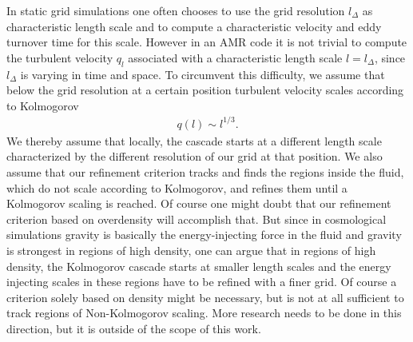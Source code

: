 In static grid simulations one often chooses to use the grid resolution
$l_{\Delta}$ as characteristic length scale and to compute a characteristic
velocity and eddy turnover time for this scale. However in an AMR code it is not
trivial to compute the turbulent velocity $q_l$ associated with a characteristic
length scale $l = l_{\Delta}$, since $l_{\Delta}$ is varying in time and space.
To circumvent this difficulty, we assume that below the grid resolution at a
certain position turbulent velocity scales according to Kolmogorov
\begin{align}
q(l) \sim l^{1/3}.
\end{align}
We thereby assume that locally, the cascade starts at a different length scale
characterized by the different resolution of our grid at that position. We also
assume that our refinement criterion tracks and finds the regions inside the
fluid, which do not scale according to Kolmogorov, and refines them until a
Kolmogorov scaling is reached. Of course one might doubt that our refinement
criterion based on overdensity will accomplish that. But since in cosmological
simulations gravity is basically the energy-injecting force in the fluid and
gravity is strongest in regions of high density, one can argue that in regions
of high density, the Kolmogorov cascade starts at smaller length scales and
the energy injecting scales in these regions have to be refined with a finer
grid. Of course a criterion solely based on density might be necessary,
but is not at all sufficient to track regions of Non-Kolmogorov scaling.
More research needs to be done in this direction, but it is outside of the 
scope of this work. 

